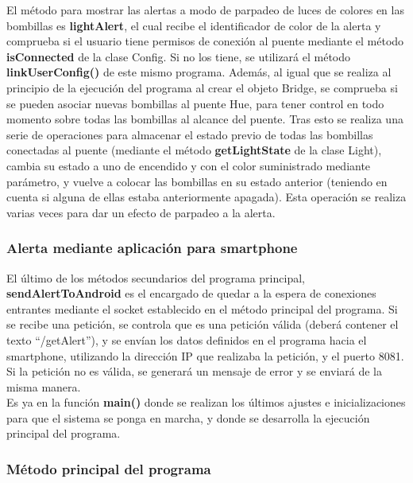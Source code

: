         El método para mostrar las alertas a modo de parpadeo de luces de colores en las bombillas es \textbf{lightAlert}, el cual recibe el identificador de color de la alerta y comprueba si el usuario tiene permisos de conexión al puente mediante el método \textbf{isConnected} de la clase Config. Si no los tiene, se utilizará el método \textbf{linkUserConfig()} de este mismo programa. Además, al igual que se realiza al principio de la ejecución del programa al crear el objeto Bridge, se comprueba si se pueden asociar nuevas bombillas al puente Hue, para tener control en todo momento sobre todas las bombillas al alcance del puente. Tras esto se realiza una serie de operaciones para almacenar el estado previo de todas las bombillas conectadas al puente (mediante el método \textbf{getLightState} de la clase Light), cambia su estado a uno de encendido y con el color suministrado mediante parámetro, y vuelve a colocar las bombillas en su estado anterior (teniendo en cuenta si alguna de ellas estaba anteriormente apagada). Esta operación se realiza varias veces para dar un efecto de parpadeo a la alerta.
        
        \subsubsection{Alerta mediante aplicación para smartphone}

        \vspace{0.3cm}

        El último de los métodos secundarios del programa principal, \textbf{sendAlertToAndroid} es el encargado de quedar a la espera de conexiones entrantes mediante el socket establecido en el método principal del programa. Si se recibe una petición, se controla que es una petición válida (deberá contener el texto ``/getAlert''), y se envían los datos definidos en el programa hacia el smartphone, utilizando la dirección IP que realizaba la petición, y el puerto 8081. Si la petición no es válida, se generará un mensaje de error y se enviará de la misma manera. \\

        Es ya en la función \textbf{main()} donde se realizan los últimos ajustes e inicializaciones para que el sistema se ponga en marcha, y donde se desarrolla la ejecución principal del programa.
        
        \subsubsection{Método principal del programa}

